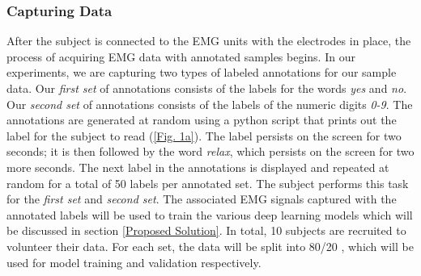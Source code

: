 \documentclass[conference]{IEEEtran}
\begin{document}
\subsubsection*{Capturing Data}
After the subject is connected to the EMG units with the electrodes in place, the process of acquiring EMG data with annotated samples begins. In our experiments, we are capturing two types of labeled annotations for our sample data. Our \textit{first set} of annotations consists of the labels for the words \textit{yes} and \textit{no}. Our \textit{second set} of annotations consists of the labels of the numeric digits \textit{0-9}. The annotations are generated at random using a python script that prints out the label for the subject to read  (\figurename \ref{Fig. 1a}). The label persists on the screen for two seconds; it is then followed by the word \textit{relax}, which persists on the screen for two more seconds. The next label in the annotations is displayed and repeated at random for a total of 50 labels per annotated set. The subject performs this task for the \textit{first set} and \textit{second set}. The associated EMG signals captured with the annotated labels will be used to train the various deep learning models which will be discussed in section \ref{Proposed Solution}. In total, 10 subjects are recruited to volunteer their data. For each set, the data will be split into 80/20 , which will be used for model training and validation respectively. 
\end{document}
